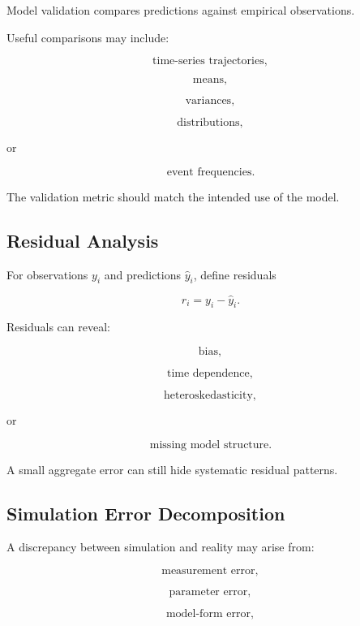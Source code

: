 Model validation compares predictions against empirical observations.

Useful comparisons may include:

\[
\boxed{
\text{time-series trajectories},
}
\]

\[
\boxed{
\text{means},
}
\]

\[
\boxed{
\text{variances},
}
\]

\[
\boxed{
\text{distributions},
}
\]

or

\[
\boxed{
\text{event frequencies}.
}
\]

The validation metric should match the intended use of the model.

\subsection{Residual Analysis}
\label{subsec:simulation-residual-analysis}

For observations \(y_i\) and predictions \(\widehat{y}_i\), define residuals

\[
\boxed{
r_i
=
y_i-\widehat{y}_i.
}
\]

Residuals can reveal:

\[
\boxed{
\text{bias},
}
\]

\[
\boxed{
\text{time dependence},
}
\]

\[
\boxed{
\text{heteroskedasticity},
}
\]

or

\[
\boxed{
\text{missing model structure}.
}
\]

A small aggregate error can still hide systematic residual patterns.

\subsection{Simulation Error Decomposition}
\label{subsec:simulation-error-decomposition}

A discrepancy between simulation and reality may arise from:

\[
\boxed{
\text{measurement error},
}
\]

\[
\boxed{
\text{parameter error},
}
\]

\[
\boxed{
\text{model-form error},
}
\]

